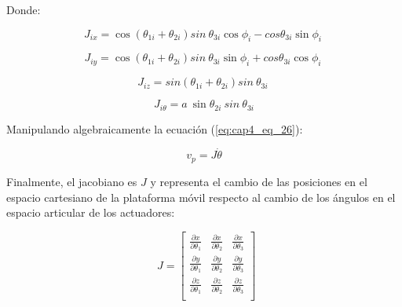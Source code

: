     Donde: 
    
    \begin{equation}
        J_{ix}=\cos  \left(  \theta _{1i}+ \theta _{2i} \right) sin~ \theta _{3i}\cos  \phi _{i}-cos  \theta _{3i}\sin  \phi _{i}~
        \label{eq:cap4_eq_28}
    \end{equation}
    \vspace{-3.5em}

    \begin{equation}
        J_{iy}=\cos  \left(  \theta _{1i}+ \theta _{2i} \right) sin~ \theta _{3i}\sin  \phi _{i}+ cos  \theta _{3i}\cos  \phi _{i}~ 
        \label{eq:cap4_eq_29}
    \end{equation}
    \vspace{-3.5em}

    \begin{equation}
          J_{iz}=sin \left(  \theta _{1i}+ \theta _{2i} \right) sin~ \theta _{3i}~  
          \label{eq:cap4_eq_30}
    \end{equation}
    \vspace{-3.5em}

    \begin{equation}
         J_{i \theta }=a~\sin  \theta _{2i}~sin~ \theta _{3i}
         \label{eq:cap4_eq_31}
    \end{equation}
         \vspace{-3.5em}
   
            \newpage
    
    Manipulando algebraicamente la ecuación (\ref{eq:cap4_eq_26}):
    
     \begin{equation}
        v_{p}=J\dot{ \theta }
        \label{eq:cap4_eq_32}
    \end{equation}   
    
    Finalmente, el jacobiano es $J$ y representa el cambio de las posiciones en el espacio cartesiano de la plataforma móvil respecto al cambio de los ángulos en el espacio articular de los actuadores:
        
    \begin{equation}
          ~~J= \left[ \begin{matrix}
            \frac{ \partial x}{ \partial  \theta _{1}}  &  \frac{ \partial x}{ \partial  \theta _{2}}  &  \frac{ \partial x}{ \partial  \theta _{3}}\\
            \frac{ \partial y}{ \partial  \theta _{1}}  &  \frac{ \partial y}{ \partial  \theta _{2}}  &  \frac{ \partial y}{ \partial  \theta _{3}}\\
            \frac{ \partial z}{ \partial  \theta _{1}}  &  \frac{ \partial z}{ \partial  \theta _{2}}  &  \frac{ \partial z}{ \partial  \theta _{3}}\\
        \end{matrix}
        \right]   
         \label{eq:cap4_eq_33}
    \end{equation}\    
        
